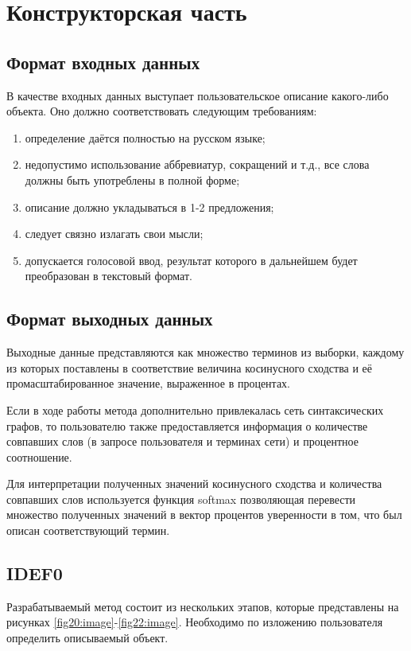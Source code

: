 \section{Конструкторская часть}
\subsection{Формат входных данных}
В качестве входных данных выступает пользовательское описание какого-либо объекта. Оно должно соответствовать следующим требованиям:
\begin{enumerate}
	\item определение даётся полностью на русском языке;
	\item недопустимо использование аббревиатур, сокращений и т.д., все слова должны быть употреблены в полной форме;
	\item описание должно укладываться в 1-2 предложения;
	\item следует связно излагать свои мысли;
	\item допускается голосовой ввод, результат которого в дальнейшем будет преобразован в текстовый формат. \newline
\end{enumerate}

\subsection{Формат выходных данных}
Выходные данные представляются как множество терминов из выборки, каждому из которых поставлены в соответствие величина косинусного сходства и её промасштабированное значение, выраженное в процентах.

Если в ходе работы метода дополнительно привлекалась сеть синтаксических графов, то пользователю также предоставляется информация о количестве совпавших слов (в запросе пользователя и терминах сети) и процентное соотношение. 

Для интерпретации полученных значений косинусного сходства и количества совпавших слов используется функция softmax \cite{softmax} позволяющая перевести множество полученных значений в вектор процентов уверенности в том, что был описан соответствующий термин. \newline

\subsection{IDEF0}
Разрабатываемый метод состоит из нескольких этапов, которые представлены на рисунках \ref{fig20:image}-\ref{fig22:image}. Необходимо по изложению пользователя определить описываемый объект. 

